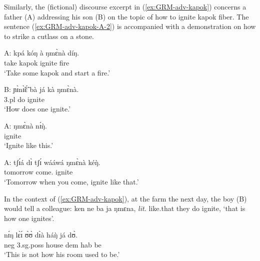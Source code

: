 \begin{exe}
\begin{exe}
\begin{exe}
{\begin{exe}
\begin{exe}
\begin{exe}
\begin{exe}
\begin{exe}
\begin{exe}
\begin{exe}
\begin{exe}
\begin{exe}
\begin{exe}
\begin{exe}
\begin{exe}
\begin{exe}
\begin{exe}
\begin{exe}
\begin{exe}
\begin{exe}
\begin{exe}
\begin{exe}
\begin{exe}
\begin{exe}
 
\z 
 \z   

Similarly,  the (fictional) discourse excerpt in
(\ref{ex:GRM-adv-kapok}) concerns a father (A) addressing his son (B) on the
topic of  how to ignite kapok fiber. The sentence (\ref{ex:GRM-adv-kapok-A-2})
is accompanied with a demonstration on how to strike a cutlass on a stone.


\ea\label{ex:GRM-adv-kapok}
 
 
 \ea\label{ex:GRM-adv-kapok-A-1}
\gll A: kpá kóŋ à ŋmɛ̀nà díŋ.\\
{}  take kapok {\conn} ignite fire\\
\glt `Take some kapok and start a fire.'

 \ex\label{ex:GRM-adv-kapok-B}
\gll B:  ɲɪ̀nɪ̃̀ɛ̃́ bà já kà ŋmɛ̀nà.\\
{} {\q} {\sc 3.pl} do {\egr} ignite\\
\glt `How does one ignite.' 

 \ex\label{ex:GRM-adv-kapok-A-2}
\gll  A: ŋmɛ̀nà nɪ́ŋ̀.\\
{} ignite {\advm}\\
\glt `Ignite like this.'

 \ex\label{ex:GRM-adv-kapok-A-3}
 \gll  A: tʃɪ́á dɪ̀ tʃɪ́ wááwá ŋmɛ̀nà kéŋ̀.\\
{} tomorrow {\conn} {\cras} come.{\pfv} ignite {\advm}\\
\glt `Tomorrow when you come, ignite like that.'
 
\z 
 \z  
 
In the context of (\ref{ex:GRM-adv-kapok}), at the farm the next day, the boy
(B) would tell a colleague: {\sls ken ne ba ja ŋmɛna},  {\it lit.} like.that 
they
do ignite, `that is how one ignites'. 


\ea\label{ex:GRM-ning-prop-2}
 \gll nɪ́ŋ lɛ̀ɪ́ ʊ̀ʊ̀ dɪ̀à háŋ̀ já dʊ̀.\\
 {\advm} {\sc neg}  {\sc 3.sg.poss} house {\sc dem} {\sc hab} be\\
\glt  `This is not how his room used to be.'

\z



\end{exe}
\end{exe}
\end{exe}
\end{exe}
\end{exe}
\end{exe}
\end{exe}
\end{exe}
\end{exe}
\end{exe}
\end{exe}
\end{exe}
\end{exe}
\end{exe}
\end{exe}
\end{exe}
\end{exe}
\end{exe}
\end{exe}
\end{exe}
\end{exe}}
\end{exe}
\end{exe}
\end{exe}
